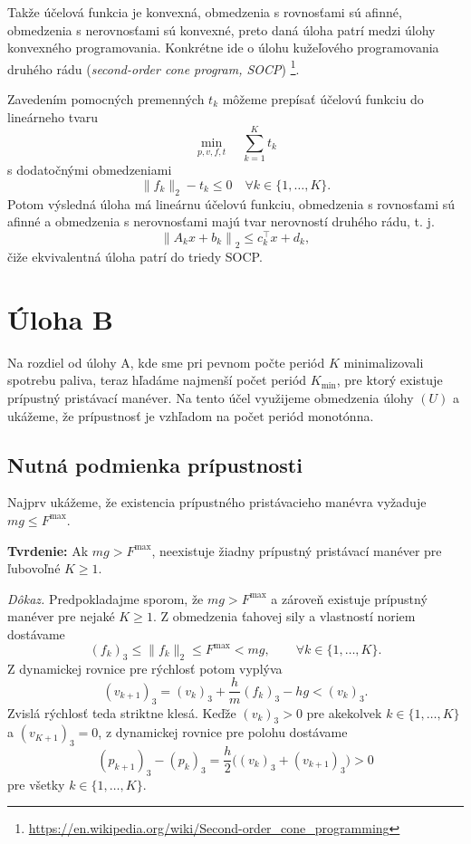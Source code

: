 \documentclass[12pt,a4paper]{article}
\begin{document}
Takže účelová funkcia je konvexná, obmedzenia s rovnosťami sú afinné,
obmedzenia s nerovnosťami sú konvexné, preto daná úloha patrí medzi úlohy
konvexného programovania. Konkrétne ide o úlohu kužeľového
programovania druhého rádu (\emph{second-order cone program, SOCP})
\footnote{\url{https://en.wikipedia.org/wiki/Second-order_cone_programming}}.

Zavedením pomocných premenných \(t_k\) môžeme prepísať účelovú funkciu do
lineárneho tvaru
\[
\min_{p,v,f,t} \quad \sum_{k=1}^{K} t_k
\]
s dodatočnými obmedzeniami
\[
\|f_k\|_2 - t_k \le 0 \quad \forall k \in \{1, \dots, K\}.
\]
Potom výsledná úloha má lineárnu účelovú funkciu, obmedzenia s rovnosťami
sú afinné a obmedzenia s nerovnosťami majú tvar nerovností druhého rádu, t. j.
\[
\left\| A_k x + b_k \right\|_2 \le c_k^\intercal x + d_k,
\]
čiže ekvivalentná úloha patrí do triedy SOCP.



\section*{Úloha B}

Na rozdiel od úlohy A, kde sme pri pevnom počte periód $K$
minimalizovali spotrebu paliva, teraz hľadáme najmenší
počet periód $K_{\min}$, pre ktorý existuje prípustný
pristávací manéver.
Na tento účel využijeme obmedzenia úlohy $(U)$ a ukážeme,
že prípustnosť je vzhľadom na počet periód monotónna.

\subsection*{Nutná podmienka prípustnosti}

Najprv ukážeme, že existencia prípustného pristávacieho
manévra vyžaduje $mg \le F^{\max}$.

\textbf{Tvrdenie:}
Ak $mg > F^{\max}$, neexistuje žiadny prípustný
pristávací manéver pre ľubovoľné $K \ge 1$.

\textit{Dôkaz.}
Predpokladajme sporom, že $mg > F^{\max}$ a zároveň
existuje prípustný manéver pre nejaké $K \ge 1$.
Z obmedzenia ťahovej sily a vlastností noriem dostávame
\[
(f_k)_3 \le \|f_k\|_2 \le F^{\max} < mg,
\qquad \forall k \in \{1,\dots,K\}.
\]
Z dynamickej rovnice pre rýchlosť potom vyplýva
\[
(v_{k+1})_3
= (v_k)_3 + \frac{h}{m}(f_k)_3 - hg
< (v_k)_3.
\]
Zvislá rýchlosť teda striktne klesá.
Keďže $(v_k)_3 > 0$ pre akekolvek $k \in \{1,\dots,K\}$
a $(v_{K+1})_3 = 0$, z dynamickej rovnice pre polohu
dostávame
\[
(p_{k+1})_3 - (p_k)_3
= \frac{h}{2}\big((v_k)_3 + (v_{k+1})_3\big) > 0
\]
pre všetky $k \in \{1,\dots,K\}$.
\end{document}
